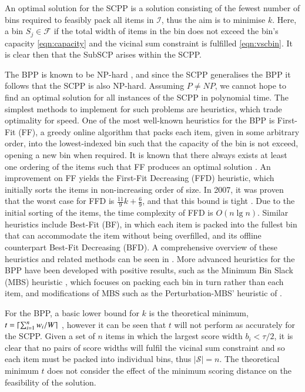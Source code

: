 \documentclass[authoryear]{elsarticle}
\begin{document}
\noindent An optimal solution for the SCPP is a solution consisting of the fewest number of bins required to feasibly pack all items in $\mathcal{I}$, thus the aim is to minimise $k$. Here, a bin $S_j \in \mathcal{F}$ if the total width of items in the bin does not exceed the bin's capacity \eqref{eqn:capacity} and the vicinal sum constraint is fulfilled \eqref{eqn:vscbin}. It is clear then that the SubSCP arises within the SCPP.

The BPP is known to be NP-hard \citep{garey1979}, and since the SCPP generalises the BPP it follows that the SCPP is also NP-hard. Assuming $P \neq NP$, we cannot hope to find an optimal solution for all instances of the SCPP in polynomial time. The simplest methods to implement for such problems are heuristics, which trade optimality for speed. One of the most well-known heuristics for the BPP is First-Fit (FF), a greedy online algorithm that packs each item, given in some arbitrary order, into the lowest-indexed bin such that the capacity of the bin is not exceed, opening a new bin when required. It is known that there always exists at least one ordering of the items such that FF produces an optimal solution \citep{lewis2009}. An improvement on FF yields the First-Fit Decreasing (FFD) heuristic, which initially sorts the items in non-increasing order of size. In 2007, it was proven that the worst case for FFD is $\frac{11}{9}k + \frac{6}{9}$, and that this bound is tight \citep{dosa2007}. Due to the initial sorting of the items, the time complexity of FFD is $O(n \lg n)$. Similar heuristics include Best-Fit (BF), in which each item is packed into the fullest bin that can accommodate the item without being overfilled, and its offline counterpart Best-Fit Decreasing (BFD). A comprehensive overview of these heuristics and related methods can be seen in \citet{coffman1984}. More advanced heuristics for the BPP have been developed with positive results, such as the Minimum Bin Slack (MBS) heuristic \citep{gupta1999}, which focuses on packing each bin in turn rather than each item, and modifications of MBS such as the Perturbation-MBS' heuristic of \citet{fleszar2002}. 

For the BPP, a basic lower bound for $k$ is the theoretical minimum, $t = \lceil\sum_{i=1}^{n} w_i / W\rceil$ \citep{martello1990l}, however it can be seen that $t$ will not perform as accurately for the SCPP. Given a set of $n$ items in which the largest score width $b_i < \tau / 2$, it is clear that no pairs of score widths will fulfil the vicinal sum constraint and so each item must be packed into individual bins, thus $|\mathcal{S}| = n$. The theoretical minimum $t$ does not consider the effect of the minimum scoring distance on the feasibility of the solution.
\end{document}
